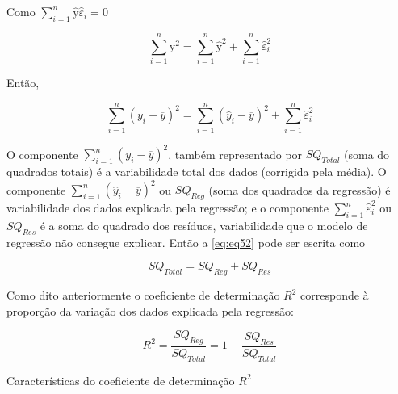 \noindent Como $\sum_{i=1}^{n} \hat{\text{y}} \hat{\varepsilon}_i = 0$

\begin{equation}
    \sum_{i=1}^{n} \text{y}^2 = \sum_{i=1}^{n} \hat{\text{y}}^2 + \sum_{i=1}^{n} \hat{\varepsilon}_i^2
\end{equation}

\noindent Então,

\begin{equation}
\label{eq:eq52}
    \sum_{i=1}^{n} (y_i - \overline{y})^2 = \sum_{i=1}^{n} (\hat{y}_i - \overline{y})^2 + \sum_{i=1}^{n} \hat{\varepsilon}_i^2
\end{equation}

\noindent O componente $\sum_{i=1}^{n} (y_i - \overline{y})^2$, também representado por $SQ_{Total}$ (soma do quadrados totais) é a variabilidade total dos dados (corrigida pela média). O componente $\sum_{i=1}^{n} (\hat{y}_i - \overline{y})^2$ ou $SQ_{Reg}$ (soma dos quadrados da regressão) é variabilidade dos dados explicada pela regressão; e o componente $\sum_{i=1}^{n} \hat{\varepsilon}_i^2$ ou $SQ_{Res}$ é a soma do quadrado dos resíduos, variabilidade que o modelo de regressão não consegue explicar. Então a \autoref{eq:eq52} pode ser escrita como

\begin{equation}
\label{eq:eq53}
    SQ_{Total} = SQ_{Reg} + SQ_{Res}
\end{equation}

\noindent Como dito anteriormente o coeficiente de determinação $R^2$ corresponde à proporção da variação dos dados explicada pela regressão:

$$R^2=\frac{SQ_{Reg}}{SQ_{Total}}= 1 - \frac{SQ_{Res}}{SQ_{Total}}$$

\noindent Características do coeficiente de determinação $R^2$

